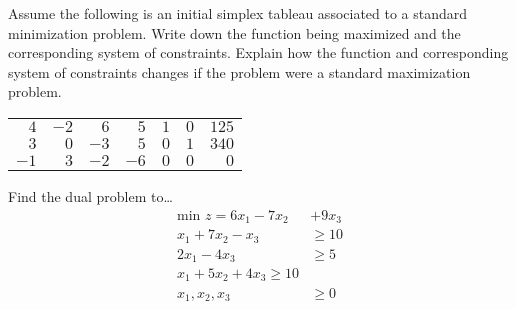 \documentclass[11pt,letterpaper]{article}
\begin{document}
 Assume the following is an initial simplex tableau associated to a standard minimization problem. Write down the function being maximized and the corresponding system of constraints. Explain how the function and corresponding system of constraints changes if the problem were a standard maximization problem.
	\begin{table}[!ht]
	\centering
	\begin{tabular}{rrrrrr|r}
	$4$ & $-2$ & $6$ & $5$ & $1$ & $0$ & $125$ \\
	$3$ & $0$ & $-3$ & $5$ & $0$ & $1$ & $340$ \\ \hline
	$-1$ & $3$ & $-2$ & $-6$ & $0$ & $0$ & $0$ 
	\end{tabular}
	\end{table}



\newpage



 Find the dual problem to\dots
	\[
	\begin{aligned}
	\text{min } z= 6x_1 - 7x_2 &+ 9x_3 \\
	x_1 + 7x_2 - x_3&\geq 10 \\
	2x_1 - 4x_3&\geq 5 \\
	x_1 + 5x_2 + 4x_3 \geq 10 \\
	x_1, x_2, x_3&\geq 0 
	\end{aligned}
	\]
\end{document}
